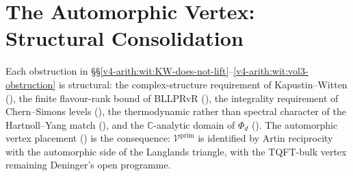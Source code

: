 \section{The Automorphic Vertex: Structural Consolidation}
\label{v4-arith:wit:summary}

Each obstruction in \S\S\ref{v4-arith:wit:KW-does-not-lift}--\ref{v4-arith:wit:vol3-obstruction}
is structural: the complex-structure requirement of
Kapustin--Witten (), the finite
flavour-rank bound of BLLPRvR (),
the integrality requirement of Chern--Simons levels
(), the thermodynamic rather than
spectral character of the Hartnoll--Yang match
(), and the \(\mathbb{C}\)-analytic
domain of \(\Phi_{d}\) ().
The automorphic vertex placement ()
is the consequence: \(\mathcal{V}^{\mathrm{prim}}\) is identified by
Artin reciprocity with the automorphic side of the Langlands triangle,
with the TQFT-bulk vertex remaining Deninger's open programme.
